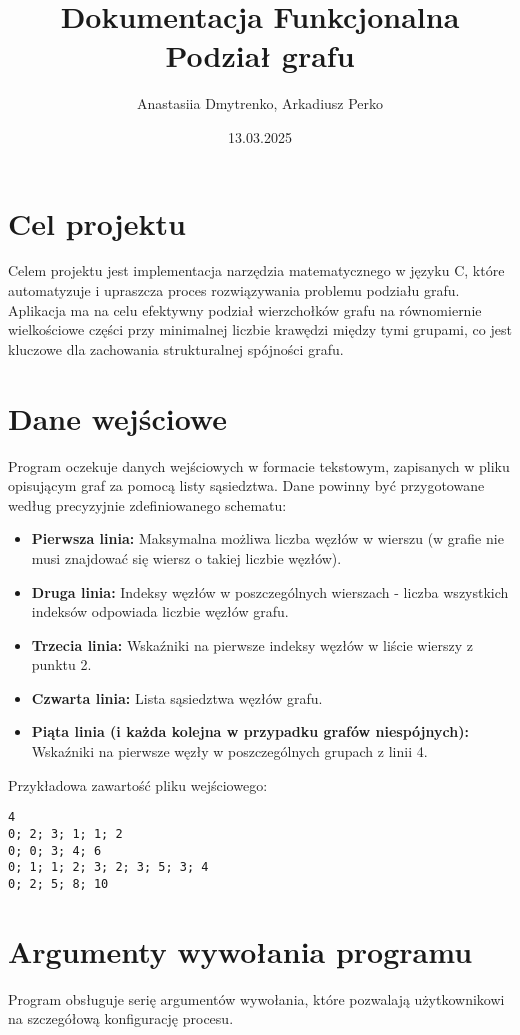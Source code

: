 \documentclass[a4paper,12pt]{article}
\title{\textbf{Dokumentacja Funkcjonalna} \\ Podział grafu}
\author{Anastasiia Dmytrenko, Arkadiusz Perko}
\date{13.03.2025}
\begin{document}
\maketitle

\section{Cel projektu}
Celem projektu jest implementacja narzędzia matematycznego w języku C, które automatyzuje i upraszcza proces rozwiązywania problemu podziału grafu. Aplikacja ma na celu efektywny podział wierzchołków grafu na równomiernie wielkościowe części przy minimalnej liczbie krawędzi między tymi grupami, co jest kluczowe dla zachowania strukturalnej spójności grafu.  

\section{Dane wejściowe}
Program oczekuje danych wejściowych w formacie tekstowym, zapisanych w pliku opisującym graf za pomocą listy sąsiedztwa. Dane powinny być przygotowane według precyzyjnie zdefiniowanego schematu:
\begin{itemize}
    \item \textbf{Pierwsza linia:} Maksymalna możliwa liczba węzłów w wierszu (w grafie nie musi znajdować się wiersz o takiej liczbie węzłów).
    \item \textbf{Druga linia:} Indeksy węzłów w poszczególnych wierszach - liczba wszystkich indeksów odpowiada liczbie węzłów grafu.
    \item \textbf{Trzecia linia:} Wskaźniki na pierwsze indeksy węzłów w liście wierszy z punktu 2.
    \item \textbf{Czwarta linia:} Lista sąsiedztwa węzłów grafu.
    \item \textbf{Piąta linia \textbf{(i każda kolejna w przypadku grafów niespójnych): }}Wskaźniki na pierwsze węzły w poszczególnych grupach z linii 4.
\end{itemize}


Przykładowa zawartość pliku wejściowego:
\begin{lstlisting}
4
0; 2; 3; 1; 1; 2
0; 0; 3; 4; 6
0; 1; 1; 2; 3; 2; 3; 5; 3; 4
0; 2; 5; 8; 10
\end{lstlisting}

\section{Argumenty wywołania programu}
Program obsługuje serię argumentów wywołania, które pozwalają użytkownikowi na szczegółową konfigurację procesu.
\end{document}
